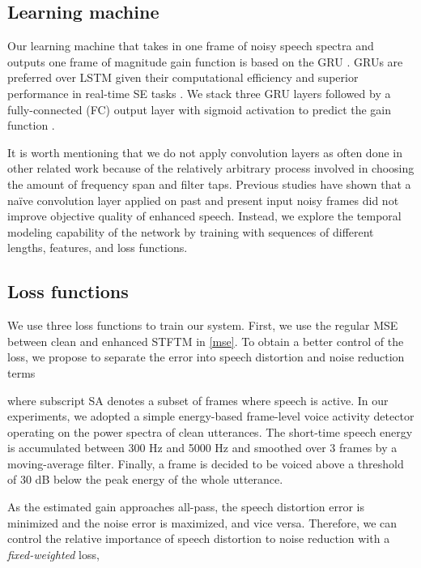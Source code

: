 \documentclass{article}
\begin{document}
\subsection{Learning machine}
Our learning machine that takes in one frame of noisy speech spectra and outputs one frame of magnitude gain function is based on the \ac{GRU} \cite{cho2014learning}. \ac{GRU}s are preferred over \ac{LSTM}\cite{hochreiter1997long} given their computational efficiency and superior performance in real-time SE tasks \cite{Reddy2019}. We stack three GRU layers followed by a fully-connected (FC) output layer with sigmoid activation to predict the gain function .


It is worth mentioning that we do not apply convolution layers as often done in other related work \cite{tan2018convolutional,zhao2018convolutional} because of the relatively arbitrary process involved in choosing the amount of frequency span and filter taps. Previous studies \cite{liu2014experiments} have shown that a na\"ive convolution layer applied on past and present input noisy frames did not improve objective quality of enhanced speech. Instead, we explore the temporal modeling capability of the network by training with sequences of different lengths, features, and loss functions.



\subsection{Loss functions}
We use three loss functions to train our system. First, we use the regular \ac{MSE} between clean and enhanced \ac{STFTM} in \eqref{mse}. To obtain a better control of the loss, we propose to separate the error into speech distortion and noise reduction terms

where subscript SA denotes a subset of frames where speech is active. In our experiments, we adopted a simple energy-based frame-level voice activity detector operating on the power spectra of clean utterances. The short-time speech energy is accumulated between 300 Hz and 5000 Hz and smoothed over 3 frames by a moving-average filter. Finally, a frame is decided to be voiced above a threshold of 30 dB below the peak energy of the whole utterance.

As the estimated gain approaches all-pass, the speech distortion error is minimized and the noise error is maximized, and vice versa. Therefore, we can control the relative importance of speech distortion to noise reduction with a \textit{fixed-weighted} loss, 
\end{document}
